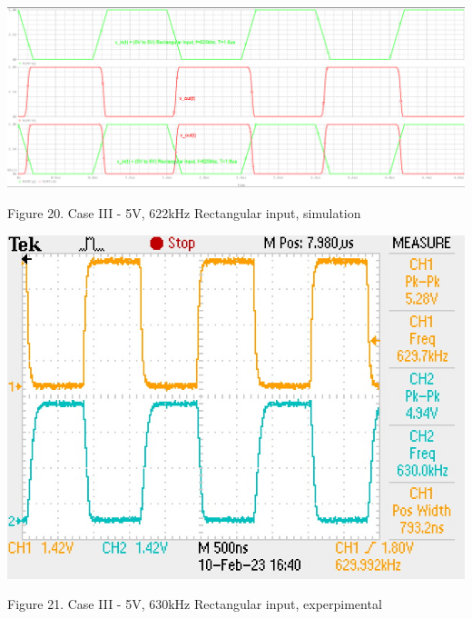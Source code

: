 \documentclass[conference]{IEEEtran}
\begin{document}
\begin{center}
    \centerline{\includegraphics[scale = 0.18]{figures/case3_results1.png}}
    Figure 20. Case III - 5V, 622kHz Rectangular input, simulation
\end{center}

\begin{center}
    \centerline{\includegraphics[scale = 0.9]{figures/case3_lab_result.JPG}}
    Figure 21. Case III - 5V, 630kHz Rectangular input, experpimental
\end{center}
\end{document}
